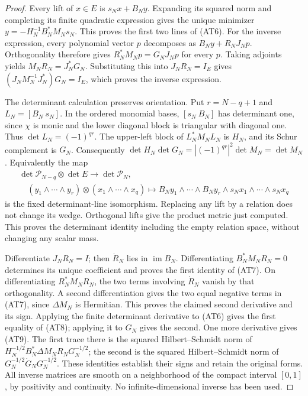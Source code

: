 \documentclass{article}
\newcommand{\im}{\operatorname{im}}
\newcommand{\cP}{\mathcal P}
\begin{document}
\begin{proof}
Every lift of $x\in E$ is $s_Nx+B_Ny$. Expanding its squared norm
and completing its finite quadratic expression gives the unique
minimizer $y=-H_N^{-1}B_N^*M_Ns_N$. This proves the first two
lines of (AT6). For the inverse expression, every polynomial vector
$p$ decomposes as $B_Ny+R_NJ_Np$. Orthogonality therefore gives
$R_N^*M_Np=G_NJ_Np$ for every $p$. Taking adjoints yields
$M_NR_N=J_N^*G_N$. Substituting this into $J_NR_N=I_E$ gives
$(J_NM_N^{-1}J_N^*)G_N=I_E$, which proves the inverse expression.

The determinant calculation preserves orientation. Put
$r=N-q+1$ and $L_N=[B_N\ s_N]$. In the ordered monomial bases,
$[s_N\ B_N]$ has determinant one, since $\chi$ is monic and the
lower diagonal block is triangular with diagonal one. Thus
$\det L_N=(-1)^{qr}$. The upper-left block of $L_N^*M_NL_N$
is $H_N$, and its Schur complement is $G_N$. Consequently
$\det H_N\det G_N=|(-1)^{qr}|^2\det M_N=\det M_N$.
Equivalently the map
\[
 \begin{gathered}
 \det\cP_{N-q}\otimes\det E\longrightarrow\det\cP_N,\\
 \quad (y_1\wedge\cdots\wedge y_r)\otimes(x_1\wedge\cdots\wedge x_q)
 \longmapsto
 B_Ny_1\wedge\cdots\wedge B_Ny_r\wedge s_Nx_1\wedge\cdots\wedge s_Nx_q
 \end{gathered}
                                                        \tag{AT10}
\]
is the fixed determinant-line isomorphism. Replacing any lift by a
relation does not change its wedge. Orthogonal lifts give the product
metric just computed. This proves the determinant identity including
the empty relation space, without changing any scalar mass.

Differentiate $J_NR_N=I$; then $\dot R_N$ lies in $\im B_N$.
Differentiating $B_N^*M_NR_N=0$ determines its unique coefficient
and proves the first identity of (AT7). On differentiating
$R_N^*M_NR_N$, the two terms involving $\dot R_N$ vanish by
that orthogonality. A second differentiation gives the two equal
negative terms in (AT7), since $\Delta M_N$ is Hermitian. This
proves the claimed second derivative and its sign. Applying the
finite determinant derivative to (AT6) gives the first equality
of (AT8); applying it to $G_N$ gives the second.
One more derivative gives (AT9). The first trace there is the squared
Hilbert--Schmidt norm of
$H_N^{-1/2}B_N^*\Delta M_NR_NG_N^{-1/2}$; the second is the
squared Hilbert--Schmidt norm of
$G_N^{-1/2}\dot G_NG_N^{-1/2}$. These identities establish their
signs and retain the original forms. All inverse matrices are smooth
on a neighborhood of the compact interval $[0,1]$, by positivity
and continuity. No infinite-dimensional inverse has been used.
\end{proof}
\end{document}
